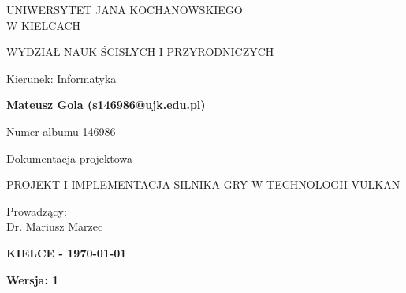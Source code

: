 \documentclass[12pt]{article}
\def\VERSION{1}
\begin{document}
\thispagestyle{empty}
\setcounter{page}{0}
\onehalfspacing
\begin{center}
    {\fontsize{16pt}{19pt}\selectfont UNIWERSYTET JANA KOCHANOWSKIEGO \\
    W KIELCACH \par}
    \vspace{0.5cm}
    {\fontsize{16pt}{19pt}\selectfont WYDZIAŁ NAUK ŚCISŁYCH I PRZYRODNICZYCH \par}
    {\fontsize{14pt}{19pt}\selectfont Kierunek: Informatyka \par}    
    \vspace{2.5cm}
    {\fontsize{19pt}{23pt}\selectfont \textbf{Mateusz Gola (s146986@ujk.edu.pl)}\par}
    {\fontsize{12pt}{16pt}\selectfont Numer albumu 146986 \par}
    \vspace{2.5cm}
    {\fontsize{16pt}{19pt}\selectfont Dokumentacja projektowa \par} 
    \vspace{0.2cm}
    {\fontsize{24pt}{29pt}\selectfont PROJEKT I IMPLEMENTACJA SILNIKA GRY W TECHNOLOGII VULKAN \par} 
\end{center}
\begin{flushright}
    \vspace{3cm}
    \begin{minipage}{0.48\textwidth} %
        {\fontsize{16pt}{19pt}\selectfont 
            Prowadzący: \\
            Dr. Mariusz Marzec
        \par}
    \end{minipage}
\end{flushright}
\vspace*{\fill}
\begin{center}
    {\fontsize{16pt}{19pt}\selectfont \textbf{KIELCE - \today} \par}
    {\fontsize{16pt}{19pt}\selectfont \textbf{Wersja: \VERSION}}
\end{center}
\newpage


\end{document}
